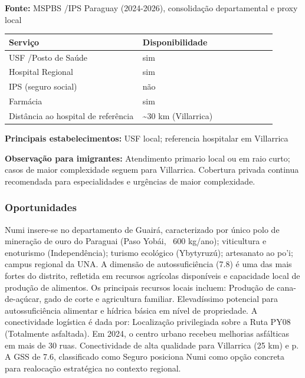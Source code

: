 \textbf{Fonte:} MSPBS /\allowbreak  IPS Paraguay (2024-2026), consolidação
departamental e proxy local

{\def\LTcaptype{none} %
\begin{longtable}{@{}>{\raggedright\arraybackslash}p{0.45\linewidth} >{\raggedright\arraybackslash}p{0.45\linewidth}@{}}
\toprule\noalign{}
Serviço & Disponibilidade \\
\midrule\noalign{}
\endhead
\bottomrule\noalign{}
\endlastfoot
USF /\allowbreak  Posto de Saúde & sim \\
Hospital Regional & sim \\
IPS (seguro social) & não \\
Farmácia & sim \\
Distância ao hospital de referência & \textasciitilde30 km
(Villarrica) \\
\end{longtable}
}

\textbf{Principais estabelecimentos:} USF local; referencia hospitalar
em Villarrica

\textbf{Observação para imigrantes:} Atendimento primario local ou em
raio curto; casos de maior complexidade seguem para Villarrica.
Cobertura privada continua recomendada para especialidades e urgências
de maior complexidade.
\newpage

\subsubsection*{Oportunidades}\label{oport-numi-0413}
Numi insere-se no departamento de Guairá, caracterizado por único polo de mineração de ouro do Paraguai (Paso Yobái, ~600 kg/ano); viticultura e enoturismo (Independência); turismo ecológico (Ybytyruzú); artesanato ao po'i; campus regional da UNA. A dimensão de autossuficiência (7.8) é uma das mais fortes do distrito, refletida em recursos agrícolas disponíveis e capacidade local de produção de alimentos. Os principais recursos locais incluem: Produção de cana-de-açúcar, gado de corte e agricultura familiar. Elevadíssimo potencial para autossuficiência alimentar e hídrica básica em nível de propriedade. A conectividade logística é dada por: Localização privilegiada sobre a Ruta PY08 (Totalmente asfaltada). Em 2024, o centro urbano recebeu melhorias asfálticas em mais de 30 ruas. Conectividade de alta qualidade para Villarrica (25 km) e p. A GSS de 7.6, classificado como Seguro posiciona Numi como opção concreta para realocação estratégica no contexto regional.

